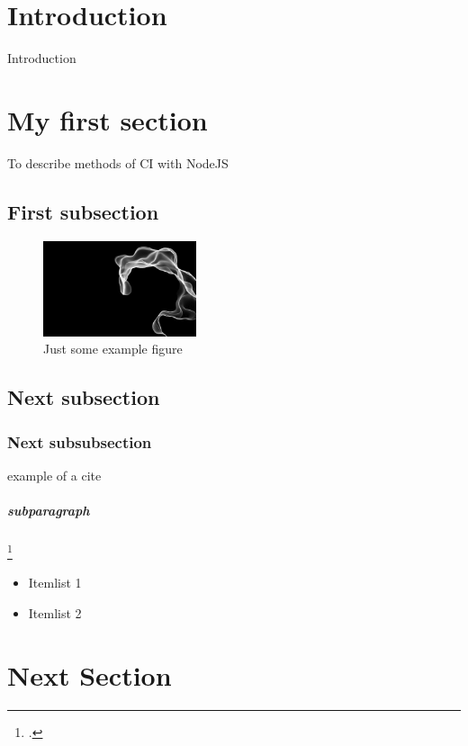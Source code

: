 \section{Introduction}
Introduction

\newpage

\section{My first section}
\label{section:Introduction}
To describe methods of CI with NodeJS

\subsection{First subsection}

\begin{figure}[h!]
  \centering
      \includegraphics[width=0.4\textwidth]{images/Perlin-Coherent.png}
  \caption{Just some example figure}
\end{figure}

\subsection{Next subsection}

\subsubsection{Next subsubsection}
 example of a cite \cite{meyer2014continuous}

\subparagraph{subparagraph}
\footcite{danezis2015privacy}

\begin{itemize}
  \item Itemlist 1
  \item Itemlist 2
\end{itemize} \cite{cranorplatform}

\section{Next Section}
\label{section:Label}

